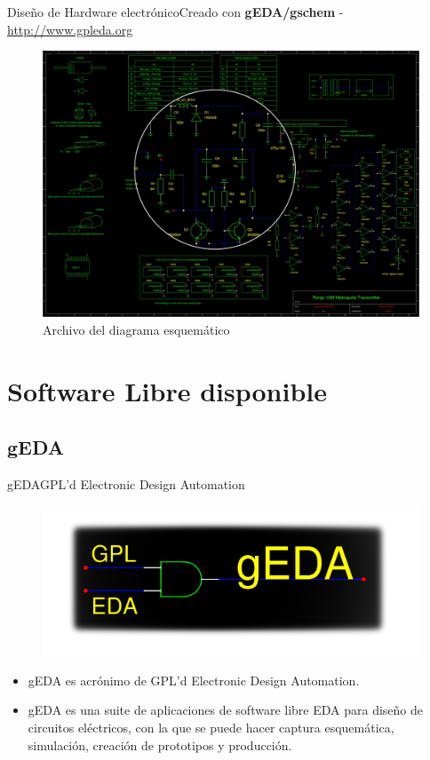 \documentclass{beamer}
\begin{document}
\begin{frame}{Diseño de Hardware electrónico}{Creado con \textbf{gEDA/gschem} - \url{http://www.gpleda.org}}
  \begin{figure}
    \includegraphics[scale=0.21]{transmisor/transmisor_esquema}
    \caption{Archivo del diagrama esquemático}
  \end{figure}
\end{frame}

\section{Software Libre disponible}

\subsection[gEDA - \url{http://www.gpleda.org}]{gEDA}


\begin{frame}{gEDA}{GPL'd Electronic Design Automation}
  \begin{figure}[!h]
    \centering
    \includegraphics[scale=0.4]{img/geda.png}
  \end{figure}
  \begin{itemize}
  \item gEDA es acrónimo de GPL'd Electronic Design Automation.
  \item gEDA es una suite de aplicaciones de software libre EDA para diseño de circuitos eléctricos, con la que se puede hacer captura esquemática, simulación, creación de prototipos y producción.
  \end{itemize}
\end{frame}
\end{document}

